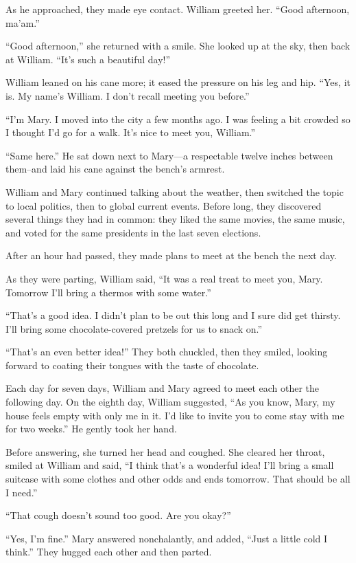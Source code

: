 As he approached, they made eye contact. William greeted her. “Good afternoon, ma'am.”

“Good afternoon,” she returned with a smile. She looked up at the sky, then back at William. “It's such a beautiful day!”

William leaned on his cane more; it eased the pressure on his leg and hip. “Yes, it is. My name's William. I don't recall meeting you before.”

“I'm Mary. I moved into the city a few months ago. I was feeling a bit crowded so I thought I'd go for a walk. It's nice to meet you, William.”

“Same here.” He sat down next to Mary—a respectable twelve inches between them–and laid his cane against the bench's armrest.

William and Mary continued talking about the weather, then switched the topic to local politics, then to global current events. Before long, they discovered several things they had in common: they liked the same movies, the same music, and voted for the same presidents in the last seven elections.

After an hour had passed, they made plans to meet at the bench the next day.

As they were parting, William said, “It was a real treat to meet you, Mary. Tomorrow I'll bring a thermos with some water.”

“That's a good idea. I didn't plan to be out this long and I sure did get thirsty. I'll bring some chocolate-covered pretzels for us to snack on.”

“That's an even better idea!” They both chuckled, then they smiled, looking forward to coating their tongues with the taste of chocolate.

\timesep

Each day for seven days, William and Mary agreed to meet each other the following day. On the eighth day, William suggested, “As you know, Mary, my house feels empty with only me in it. I'd like to invite you to come stay with me for two weeks.” He gently took her hand.

Before answering, she turned her head and coughed. She cleared her throat, smiled at William and said, “I think that's a wonderful idea! I'll bring a small suitcase with some clothes and other odds and ends tomorrow. That should be all I need.”

“That cough doesn't sound too good. Are you okay?”

“Yes, I'm fine.” Mary answered nonchalantly, and added, “Just a little cold I think.” They hugged each other and then parted.

